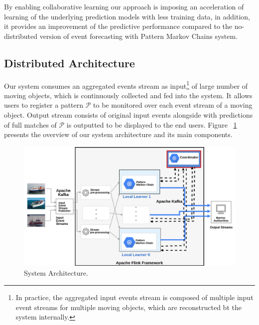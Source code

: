 \par By enabling collaborative learning our approach is imposing an acceleration of learning of the underlying prediction models with less training data, in addition, it provides an improvement of the predictive performance compared to the no-distributed  version of event forecasting with Pattern Markov Chains system. 


\subsection{Distributed Architecture}
\label{sec:architecture}
Our system consumes an aggregated events stream as input\footnote{In practice, the aggregated input events stream is composed of multiple input event streams for multiple moving objects, which are reconstructed bt the system internally.} of large number of moving objects, which is continuously collected and fed into the system. It allows users to register a pattern $\mathcal{P}$ to be monitored over each event stream of a moving object. Output stream consists of original input events alongside with predictions of full matches of $\mathcal{P}$ is outputted to be displayed to the end users. Figure ~\ref{fig:architecture} presents the overview of our system architecture and its main components.      


\begin{figure}[h]

\includegraphics[height=2.5in, width=\linewidth]{figures/distributed_architecture.png}
	
\caption{System Architecture.}
\label{fig:architecture}
\end{figure}

